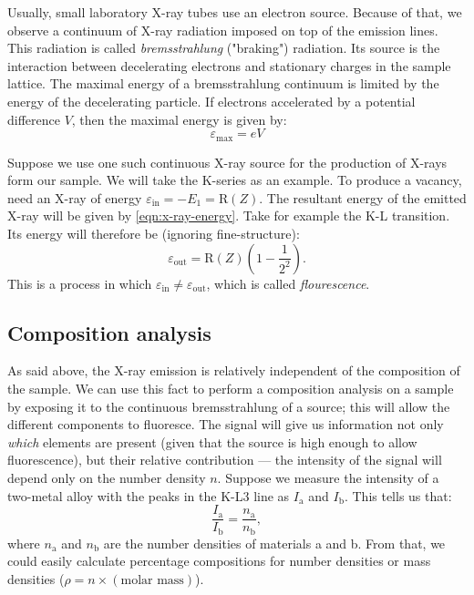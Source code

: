 \documentclass[11pt,a4paper,twoside,onecolumn]{article}
\newcommand{\rydberg}{\mathrm{R}}
\begin{document}
Usually, small laboratory X-ray tubes use an electron source. Because of that, we observe a continuum of X-ray radiation imposed on top of the emission lines. This radiation is called \emph{bremsstrahlung} ("braking") radiation. Its source is the interaction between decelerating electrons and stationary charges in the sample lattice. The maximal energy of a bremsstrahlung continuum is limited by the energy of the decelerating particle. If electrons accelerated by a potential difference $V$, then the maximal energy is given by:
\begin{equation}
    \varepsilon_\mathrm{max} = eV
\end{equation}

Suppose we use one such continuous X-ray source for the production of X-rays form our sample. We will take the K-series as an example. To produce a vacancy, need an X-ray of energy $\varepsilon_\mathrm{in} = - E_1 = \rydberg(Z)$. The resultant energy of the emitted X-ray will be given by \eqref{eqn:x-ray-energy}. Take for example the K-L transition. Its energy will therefore be (ignoring fine-structure):
\begin{equation}
    \varepsilon_\mathrm{out} = \rydberg\left(Z\right) \left(1 - \frac{1}{2^2}\right).
\end{equation}
This is a process in which $\varepsilon_\mathrm{in} \neq \varepsilon_\mathrm{out}$, which is called \emph{flourescence}.

\subsection{Composition analysis}
As said above, the X-ray emission is relatively independent of the composition of the sample. We can use this fact to perform a composition analysis on a sample by exposing it to the continuous bremsstrahlung of a source; this will allow the different components to fluoresce. The signal will give us information not only \emph{which} elements are present (given that the source is high enough to allow fluorescence), but their relative contribution --- the intensity of the signal will depend only on the number density $n$. Suppose we measure the intensity of a two-metal alloy with the peaks in the K-L3 line as $I_\mathrm{a}$ and $I_\mathrm{b}$.
This tells us that:
\begin{equation}
    \frac{I_\mathrm{a}}{I_\mathrm{b}} = \frac{n_\mathrm{a}}{n_\mathrm{b}},
\end{equation}
where $n_\mathrm{a}$ and $n_\mathrm{b}$ are the number densities of materials a and b. From that, we could easily calculate percentage compositions for number densities or mass densities ($\rho = n \times (\text{molar mass})$).
\end{document}
